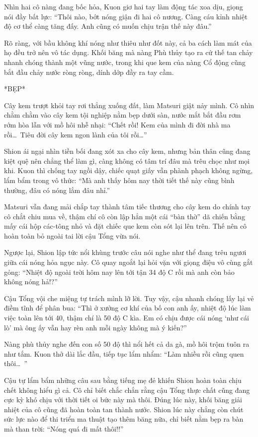 \documentclass[../main.tex]{subfiles}
\begin{document}
Nhìn hai cô nàng đang bốc hỏa, Kuon giơ hai tay làm động tác xoa dịu, giọng nói đầy bất lực: ``Thôi nào, bớt nóng giận đi hai cô nương. Càng cáu kỉnh nhiệt độ cơ thể càng tăng đấy. Anh cũng có muốn chịu trận thế này đâu.''

Rõ ràng, với bầu không khí nóng như thiêu như đốt này, cả ba cách làm mát của họ đều trở nên vô tác dụng. Khối băng mà nàng Phù thủy tạo ra cứ thế tan chảy nhanh chóng thành một vũng nước, trong khi que kem của nàng Cổ động cũng bắt đầu chảy nước ròng ròng, dính dớp đầy ra tay cầm.

*BẸP*

Cây kem trượt khỏi tay rơi thẳng xuống đất, làm Matsuri giật nảy mình. Cô nhìn chằm chằm vào cây kem tội nghiệp nằm bẹp dưới sàn, nước mắt bắt đầu rơm rớm hòa lẫn với mồ hôi nhễ nhại: ``Chết rồi! Kem của mình đi đời nhà ma rồi\dots\ Tiêu đời cây kem ngon lành của tôi rồi\dots''

Shion ái ngại nhìn tiền bối đang xót xa cho cây kem, nhưng bản thân cũng đang kiệt quệ nên chẳng thể làm gì, càng không có tâm trí đâu mà trêu chọc như mọi khi. Kuon thì chống tay ngồi dậy, chiếc quạt giấy vẫn phành phạch không ngừng, lẩm bẩm trong vô thức: ``Mà anh thấy hôm nay thời tiết thế này cũng bình thường, đâu có nóng lắm đâu nhỉ.''

Matsuri vẫn đang mải chắp tay thành tâm tiếc thương cho cây kem do chính tay cô chắt chiu mua về, thậm chí cô còn lập hẳn một cái ``bàn thờ'' dã chiến bằng mấy cái hộp các-tông nhỏ và đặt chiếc que kem còn sót lại lên trên. Thế nên cô hoàn toàn bỏ ngoài tai lời cậu Tổng vừa nói.

Ngược lại, Shion lập tức nổi khùng trước câu nói nghe như thể đang trêu ngươi giữa cái nóng hỏa ngục này. Cô quay ngoắt lại hỏi vặn với giọng điệu vô cùng gắt gỏng: ``Nhiệt độ ngoài trời hôm nay lên tới tận 34 độ C rồi mà anh còn bảo không nóng hả!?''

Cậu Tổng vội che miệng tự trách mình lỡ lời. Tuy vậy, cậu nhanh chóng lấy lại vẻ điềm tĩnh để phân bua: ``Thì ở xưởng cơ khí của bố con anh ấy, nhiệt độ lúc làm việc toàn lên tới 40, thậm chí là 50 độ C kìa. Em có chịu được cái nóng `như cái lò' mà ông ấy vẫn hay rèn anh mỗi ngày không mà ý kiến?''

Nàng phù thủy nghe đến con số 50 độ thì nổi hết cả da gà, mồ hôi trộm tuôn ra như tắm. Kuon thở dài lắc đầu, tiếp tục lẩm nhẩm: ``Làm nhiều rồi cũng quen thôi\dots\ ''

Cậu tự lẩm bẩm những câu sau bằng tiếng mẹ đẻ khiến Shion hoàn toàn chịu chết không hiểu gì cả. Cô chỉ biết chắc chắn rằng cậu Tổng thực chất cũng đang cực kỳ khó chịu với thời tiết oi bức này mà thôi. Đúng lúc này, khối băng giải nhiệt của cô cũng đã hoàn toàn tan thành nước. Shion lúc này chẳng còn chút sức lực nào để thi triển ma thuật tạo thêm băng nữa, chỉ biết nằm bẹp ra bàn mà than trời: ``Nóng quá đi mất thôi!!''
\end{document}
